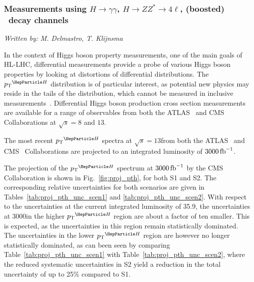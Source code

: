 \subsubsection{Measurements using $H \to \gamma\gamma$, $H \to ZZ^* \to 4\ell$, (boosted) \Hbb\ decay channels}
\label{sec:diffxs}

\begin{center}{\it Written by: M. Delmastro, T. Klijnsma} \end{center}



\noindent
In the context of Higgs boson property measurements, one of the main goals of HL-LHC, differential measurements provide a probe of various Higgs boson properties by looking at distortions of differential distributions.
% 
The $\pTH$ distribution is of particular interest, as potential new physics may reside in the tails of the distribution, which cannot be measured in inclusive measurements~\cite{%
Khachatryan:2016vau,%
Aad:2015zhl,%
CMS:2018lkl%
}.
% 
Differential Higgs boson production cross section measurements are available for a range of observables from both the ATLAS~\cite{%
Aad:2014lwa,%
Aad:2014tca,%
Aad:2016lvc,%
Aaboud:2018xdt,%
Aaboud:2017oem,%
Aaboud:2018ezd%
} and CMS~\cite{%
Khachatryan:2015rxa,%
Khachatryan:2015yvw,%
Khachatryan:2016vnn,%
Sirunyan:2018kta,%
CMS_AN_2016-442,%
CMS-PAS-HIG-17-028%
} Collaborations at $\sqrt{s}=8$ and $13$\UTeV.

The most recent $\pTH$ spectra at $\sqrt{s}=13$\UTeV from both the ATLAS~\cite{Aaboud:2018ezd} and CMS~\cite{CMS-PAS-HIG-17-028} Collaborations are projected to an integrated luminosity of $3000\mbox{\ensuremath{\,\text{fb}^\text{$-$1}}}$.

The projection of the $\pTH$ spectrum at $3000\mbox{\ensuremath{\,\text{fb}^\text{$-$1}}}$ by the CMS Collaboration is shown in Fig.~\ref{fig:proj_pth}, for both S1 and S2. The corresponding relative uncertainties for both scenarios are given in Tables~\ref{tab:proj_pth_unc_scen1} and \ref{tab:proj_pth_unc_scen2}. With respect to the uncertainties at the current integrated luminosity of 35.9\fbinv, the uncertainties at 3000\fbinv in the higher $\pTH$ region are about a factor of ten smaller. This is expected, as the uncertainties in this region remain statistically dominated.
% 
The uncertainties in the lower $\pTH$ region are however no longer statistically dominated, as can been seen by comparing Table~\ref{tab:proj_pth_unc_scen1} with Table~\ref{tab:proj_pth_unc_scen2}, where the reduced systematic uncertainties in S2 yield a reduction in the total uncertainty of up to 25\% compared to S1.

